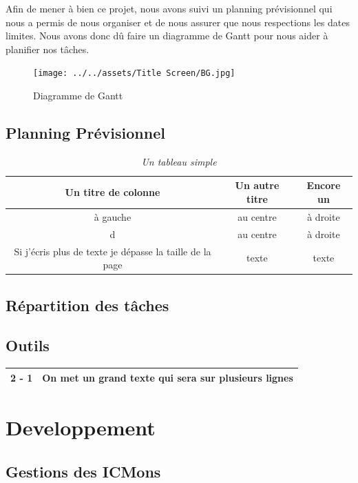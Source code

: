 \documentclass[12pt,a4paper, twoside]{article}
\begin{document}
    Afin de mener à bien ce projet, nous avons suivi un planning prévisionnel qui nous a permis de nous organiser et de nous assurer que nous respections les dates limites. Nous avons donc dû faire un diagramme de Gantt pour nous aider à planifier nos tâches.
    \begin{figure}[h]
        \centering
        \texttt{[image: ../../assets/Title Screen/BG.jpg]}
        \label{fig:GANTT}
        \caption{Diagramme de Gantt}
    \end{figure}
\subsection{Planning Prévisionnel}
\begin{table}[h]
    \centering
    \begin{tabular}{|c|c|c|}
        \hline
        Un titre de colonne & Un autre titre & Encore un \\
        \hline
        à gauche & au centre & à droite \\
        \hline
        d & au centre & à droite \\
        \hline
        Si j’écris plus de texte je dépasse la taille de la page & texte & texte \\
        \hline
    \end{tabular}
    \vspace{1cm}
    \caption{\emph{Un tableau simple}}
    \label{tab:test}
\end{table}

\subsection{Répartition des tâches}
\subsection{Outils}
\newpage
\begin{center}
\begin{tabular}{|c|p{8cm}|}
\hline
2 - 1 & On met un grand texte qui sera sur plusieurs lignes \\
\hline
\end{tabular}
\end{center}

\section{Developpement}
\subsection{Gestions des ICMons}
\end{document}
